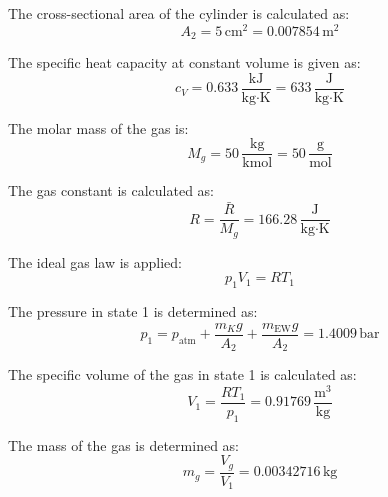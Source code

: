 The cross-sectional area of the cylinder is calculated as:  
\[
A_2 = 5 \, \text{cm}^2 = 0.007854 \, \text{m}^2
\]  

The specific heat capacity at constant volume is given as:  
\[
c_V = 0.633 \, \frac{\text{kJ}}{\text{kg·K}} = 633 \, \frac{\text{J}}{\text{kg·K}}
\]  

The molar mass of the gas is:  
\[
M_g = 50 \, \frac{\text{kg}}{\text{kmol}} = 50 \, \frac{\text{g}}{\text{mol}}
\]  

The gas constant is calculated as:  
\[
R = \frac{\bar{R}}{M_g} = 166.28 \, \frac{\text{J}}{\text{kg·K}}
\]  

The ideal gas law is applied:  
\[
p_1 V_1 = R T_1
\]  

The pressure in state 1 is determined as:  
\[
p_1 = p_{\text{atm}} + \frac{m_K g}{A_2} + \frac{m_{\text{EW}} g}{A_2} = 1.4009 \, \text{bar}
\]  

The specific volume of the gas in state 1 is calculated as:  
\[
V_1 = \frac{R T_1}{p_1} = 0.91769 \, \frac{\text{m}^3}{\text{kg}}
\]  

The mass of the gas is determined as:  
\[
m_g = \frac{V_g}{V_1} = 0.00342716 \, \text{kg}
\]